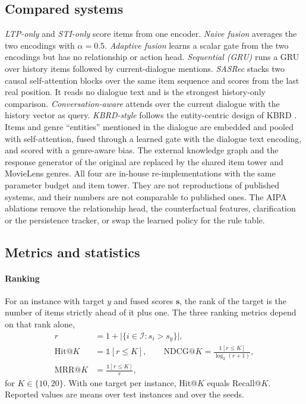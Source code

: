 \subsection{Compared systems}
\emph{LTP-only} and \emph{STI-only} score items from one encoder. \emph{Naive fusion} averages the two encodings with $\alpha=0.5$. \emph{Adaptive fusion} learns a scalar gate from the two encodings but has no relationship or action head. \emph{Sequential (GRU)} runs a GRU \cite{hidasi2016gru4rec} over history items followed by current-dialogue mentions. \emph{SASRec} \cite{kang2018sasrec} stacks two causal self-attention blocks over the same item sequence and scores from the last real position. It reads no dialogue text and is the strongest history-only comparison. \emph{Conversation-aware} attends over the current dialogue with the history vector as query. \emph{KBRD-style} follows the entity-centric design of KBRD \cite{chen2019kbrd}. Items and genre ``entities'' mentioned in the dialogue are embedded and pooled with self-attention, fused through a learned gate with the dialogue text encoding, and scored with a genre-aware bias. The external knowledge graph and the response generator of the original are replaced by the shared item tower and MovieLens genres. All four are in-house re-implementations with the same parameter budget and item tower. They are not reproductions of published systems, and their numbers are not comparable to published ones. The AIPA ablations remove the relationship head, the counterfactual features, clarification or the persistence tracker, or swap the learned policy for the rule table.

\subsection{Metrics and statistics}
\label{sec:metrics}
\paragraph{Ranking}
For an instance with target $y$ and fused scores $\mathbf{s}$, the rank of the target is the number of items strictly ahead of it plus one. The three ranking metrics depend on that rank alone,
\begin{align}
  r &= 1+\big|\{i\in\mathcal{I}: s_i>s_y\}\big|, \label{eq:rank}\\
  \mathrm{Hit@}K &= \mathbb{1}[r\le K],\qquad
  \mathrm{NDCG@}K = \frac{\mathbb{1}[r\le K]}{\log_2(r+1)},\nonumber\\
  \mathrm{MRR@}K &= \frac{\mathbb{1}[r\le K]}{r}, \label{eq:rankmetrics}
\end{align}
for $K\in\{10,20\}$. With one target per instance, Hit@$K$ equals Recall@$K$. Reported values are means over test instances and over the \nSeeds{} seeds.

